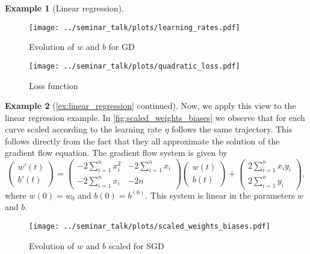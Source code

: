 \documentclass[12pt]{article}
\theoremstyle{definition}
\newtheorem{example}[example]{Example}
\numberwithin{equation}{section}
\begin{document}
\begin{example}[Linear regression]
  \begin{figure}[htb]
    \centering
    \texttt{[image: ../seminar\_talk/plots/learning\_rates.pdf]}
    \caption{Evolution of $w$ and $b$ for GD}
    \label{fig:learning_rates}
  \end{figure}

  \begin{figure}[htb]
    \centering
    \texttt{[image: ../seminar\_talk/plots/quadratic\_loss.pdf]}
    \caption{Loss function}
    \label{fig:quadratic_loss_function}
  \end{figure}
\end{example}


\begin{example}[\autoref{ex:linear_regression} continued]
  Now, we apply this view to the linear regression example. In \autoref{fig:scaled_weights_biases} we observe that for each curve scaled according to the learning rate $\eta$ follows the same trajectory. This follows directly from the fact that they all approximate the solution of the gradient flow equation. The gradient flow system is given by
  \begin{equation*}
    \begin{pmatrix}
      w'(t)      \\
      b'(t)     
  \end{pmatrix}
  = 
  \begin{pmatrix}
    -2  \displaystyle\sum_{i=1}^n x_i^2  &  -2  \displaystyle\sum_{i=1}^n x_i      \\
      -2  \displaystyle\sum_{i=1}^n x_i  &  -2n      
  \end{pmatrix}
  \begin{pmatrix}
    w(t)     \\
    b(t)    
  \end{pmatrix}
  +
  \begin{pmatrix}
    2  \displaystyle\sum_{i=1}^n x_i y_i     \\
    2  \displaystyle\sum_{i=1}^n y_i    
  \end{pmatrix},
  \end{equation*}
  where $w(0) = w_{0}$ and $b(0) = b^{(0)}$. This system is linear in the parameters $w$ and $b$.
  \begin{figure}[htb]
    \centering
    \texttt{[image: ../seminar\_talk/plots/scaled\_weights\_biases.pdf]}
    \caption{Evolution of $w$ and $b$ scaled for SGD}
    \label{fig:scaled_weights_biases}
  \end{figure}
\end{example}
\end{document}
